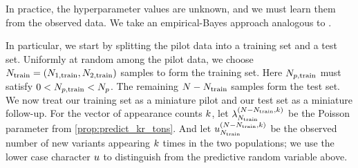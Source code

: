 In practice, the hyperparameter values are unknown, and we must learn them from the observed data.
We take an empirical-Bayes approach analogous to \citet{Masoero2022}. 

In particular, we start by splitting the pilot data into a training set and a test set. Uniformly at random among the
pilot data, we choose $\vecsamplesize_\train =(\samplesize{1,\train}, \samplesize{2,\train})$ samples to form the training set.
Here $N_{p,\text{train}}$ must satisfy $0 < N_{p,\text{train}} < N_{p}$.
The remaining $\vecsamplesize - \vecsamplesize_\train$ samples form the test set. 
%
We now treat our training set as a miniature pilot and our test set as a miniature follow-up. 
For the vector of appearance counts $\vecoccurrence$, let $\newsparam{\vecsamplesize_\train}{\vecsamplesize - \vecsamplesize_\train, \vecoccurrence}$ 
be the Poisson parameter from \cref{prop:predict_kr_tons}. And let $\obsnews{\vecsamplesize_\train}{\vecsamplesize - \vecsamplesize_\train, \vecoccurrence}$
be the observed number of new variants appearing $\vecoccurrence$ times in the two populations; we use the lower
case character $u$ to distinguish from the predictive random variable above.

